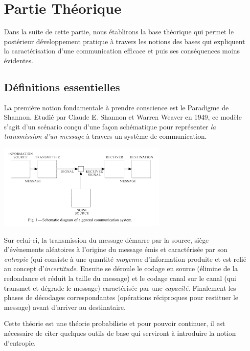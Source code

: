 \documentclass[a4paper,12pt,french]{article}
\begin{document}
\section{Partie Théorique}
Dans la suite de cette partie, nous établirons la base théorique qui permet le postérieur développement pratique à travers les notions des bases qui expliquent la caractérisation d’une communication efficace et puis ses conséquences moins évidentes.


	\subsection{Définitions essentielles}
	
	La première notion fondamentale à prendre conscience est le Paradigme de Shannon. Etudié par Claude E. Shannon et Warren Weaver en 1949, ce modèle s’agit d’un scénario conçu d’une façon schématique pour représenter \textit{la transmission d'un message} à travers un système de communication.
	
	\begin{center} 
    \includegraphics[scale=1.5]{shannon.png}
    \label{Schéma de Shannon} 
    \end{center}
	
	Sur celui-ci, la transmission du message démarre par la source, siège d’évènements aléatoires à l’origine du message émis et caractérisée par son \textit{entropie} (qui consiste à une quantité \textit{moyenne} d’information produite et est relié au concept d’\textit{incertitude}. Ensuite se déroule le codage en source (élimine de la redondance et réduit la taille du message) et le codage canal sur le canal (qui transmet et dégrade le message) caractérisée par une \textit{capacité}. Finalement les phases de décodages correspondantes (opérations réciproques pour restituer le message) avant d’arriver au destinataire.
    
    Cette théorie est une théorie probabiliste et pour pouvoir continuer, il est nécessaire de citer quelques outils de base qui serviront à introduire la notion d’entropie.
    
\end{document}
